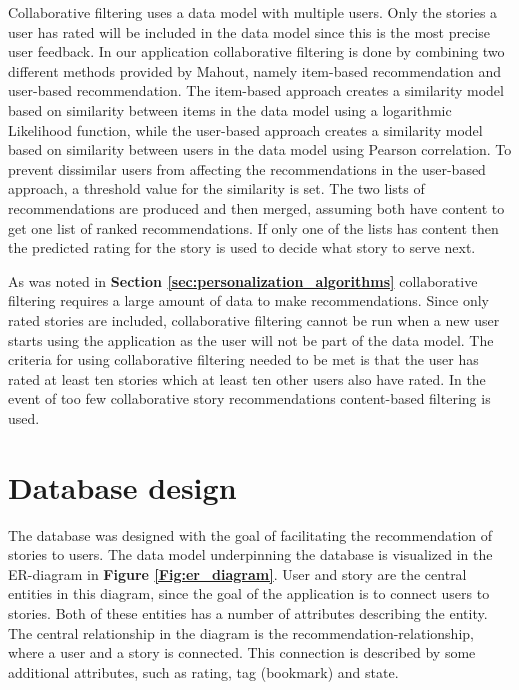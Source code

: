 Collaborative filtering uses a data model with multiple users. Only the stories a user has rated will be included in the data model since this is the most precise user feedback. In our application collaborative filtering is done by combining two different methods provided by Mahout, namely item-based recommendation and user-based recommendation. The item-based approach creates a similarity model based on similarity between items in the data model using a logarithmic Likelihood function, while the user-based approach creates a similarity model based on similarity between users in the data model using Pearson correlation. To prevent dissimilar users from affecting the recommendations in the user-based approach, a threshold value for the similarity is set. The two lists of recommendations are produced and then merged, assuming both have content to get one list of ranked recommendations. If only one of the lists has content then the predicted rating for the story is used to decide what story to serve next.\newline

As was noted in \textbf{Section \ref{sec:personalization_algorithms}} collaborative filtering requires a large amount of data to make recommendations. Since only rated stories are included, collaborative filtering cannot be run when a new user starts using the application as the user will not be part of the data model. The criteria for using collaborative filtering needed to be met is that the user has rated at least ten stories which at least ten other users also have rated. In the event of too few collaborative story recommendations content-based filtering is used. 

\section{Database design}
\label{sec:database_design}

The database was designed with the goal of facilitating the recommendation of stories to users. The data model underpinning the database is visualized in the ER-diagram in \textbf{Figure \ref{Fig:er_diagram}}. User and story are the central entities in this diagram, since the goal of the application is to connect users to stories. Both of these entities has a number of attributes describing the entity. The central relationship in the diagram is the recommendation-relationship, where a user and a story is connected. This connection is described by some additional attributes, such as rating, tag (bookmark) and state. \newline

